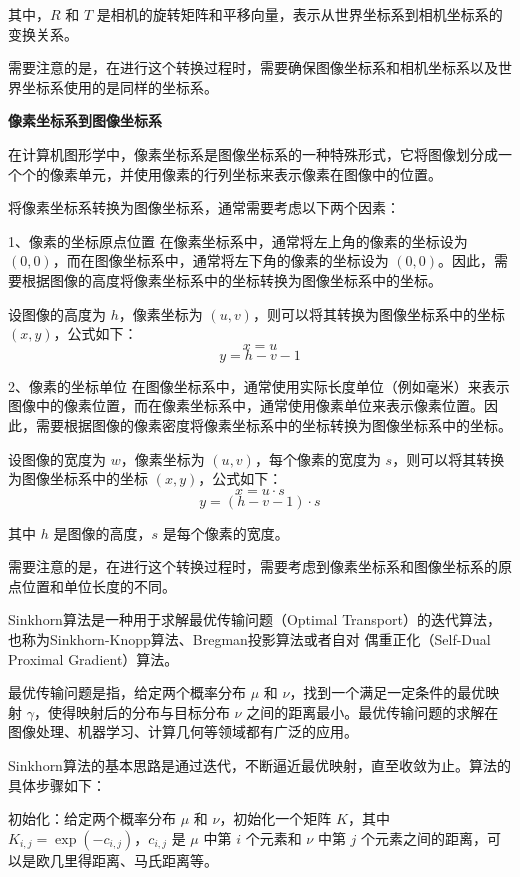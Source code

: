 \documentclass[10pt]{article}
\begin{document}
其中，$R$ 和 $T$ 是相机的旋转矩阵和平移向量，表示从世界坐标系到相机坐标系的变换关系。

需要注意的是，在进行这个转换过程时，需要确保图像坐标系和相机坐标系以及世界坐标系使用的是同样的坐标系。

\textbf{像素坐标系到图像坐标系}

在计算机图形学中，像素坐标系是图像坐标系的一种特殊形式，它将图像划分成一个个的像素单元，并使用像素的行列坐标来表示像素在图像中的位置。

将像素坐标系转换为图像坐标系，通常需要考虑以下两个因素：

1、像素的坐标原点位置
在像素坐标系中，通常将左上角的像素的坐标设为 $(0,0)$，而在图像坐标系中，通常将左下角的像素的坐标设为 $(0,0)$。因此，需要根据图像的高度将像素坐标系中的坐标转换为图像坐标系中的坐标。

设图像的高度为 $h$，像素坐标为 $(u,v)$，则可以将其转换为图像坐标系中的坐标 $(x,y)$，公式如下：
$$x = u$$
$$y = h - v - 1$$

2、像素的坐标单位
在图像坐标系中，通常使用实际长度单位（例如毫米）来表示图像中的像素位置，而在像素坐标系中，通常使用像素单位来表示像素位置。因此，需要根据图像的像素密度将像素坐标系中的坐标转换为图像坐标系中的坐标。

设图像的宽度为 $w$，像素坐标为 $(u,v)$，每个像素的宽度为 $s$，则可以将其转换为图像坐标系中的坐标 $(x,y)$，公式如下：
$$x = u \cdot s$$
$$y = (h - v - 1) \cdot s$$

其中 $h$ 是图像的高度，$s$ 是每个像素的宽度。

需要注意的是，在进行这个转换过程时，需要考虑到像素坐标系和图像坐标系的原点位置和单位长度的不同。


	




\vspace{100pt}
Sinkhorn算法是一种用于求解最优传输问题（Optimal Transport）的迭代算法，也称为Sinkhorn-Knopp算法、Bregman投影算法或者自对
偶重正化（Self-Dual Proximal Gradient）算法。

最优传输问题是指，给定两个概率分布 $\mu$ 和 $\nu$，找到一个满足一定条件的最优映射 $\gamma$，使得映射后的分布与目标分布 $\nu$ 
之间的距离最小。最优传输问题的求解在图像处理、机器学习、计算几何等领域都有广泛的应用。

Sinkhorn算法的基本思路是通过迭代，不断逼近最优映射，直至收敛为止。算法的具体步骤如下：

初始化：给定两个概率分布 $\mu$ 和 $\nu$，初始化一个矩阵 $K$，其中 $K_{i,j} = \exp(-c_{i,j})$，$c_{i,j}$ 是 $\mu$ 中第
$i$ 个元素和 $\nu$ 中第 $j$ 个元素之间的距离，可以是欧几里得距离、马氏距离等。
\end{document}
